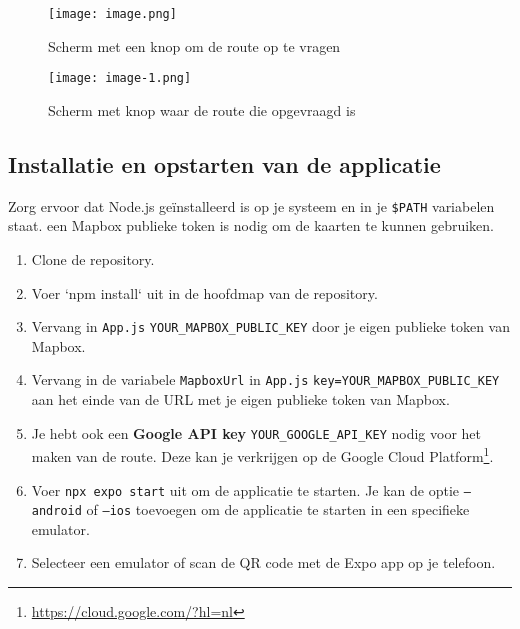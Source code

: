 \begin{figure}[htbp]
    \centering
    \begin{minipage}[b]{0.45\textwidth}
        \centering
        \texttt{[image: image.png]}
        \caption{Scherm met een knop om de route op te vragen}
        \label{fig:Scherm met een knop om de route op te vragen}
    \end{minipage}
    \hspace{0.05\textwidth}
    \begin{minipage}[b]{0.45\textwidth}
        \centering
        \texttt{[image: image-1.png]}
        \caption{Scherm met knop waar de route die opgevraagd is}
        \label{fig:Scherm met knop waar route die opgevraagd is}
    \end{minipage}
\end{figure}

\subsection{Installatie en opstarten van de applicatie}
\label{sec:installatie en opstarten van de applicatie}


Zorg ervoor dat Node.js geïnstalleerd is op je systeem en in je \texttt{\$PATH} variabelen staat.
een Mapbox publieke token is nodig om de kaarten te kunnen gebruiken.

\begin{enumerate}
    \item Clone de repository.
    \item Voer `npm install` uit in de hoofdmap van de repository.
    \item Vervang in \texttt{App.js} \texttt{YOUR\_MAPBOX\_PUBLIC\_KEY} door je eigen publieke token van Mapbox.
    \item Vervang in de variabele \texttt{MapboxUrl} in \texttt{App.js} \texttt{key=YOUR\_MAPBOX\_PUBLIC\_KEY} aan het einde van de URL met je eigen publieke token van Mapbox.
    \item Je hebt ook een \textbf{Google API key} \texttt{YOUR\_GOOGLE\_API\_KEY} nodig voor het maken van de route. Deze kan je verkrijgen op de Google Cloud Platform\footnote{\url{https://cloud.google.com/?hl=nl}}.
    \item Voer \texttt{npx expo start} uit om de applicatie te starten. Je kan de optie \texttt{--android} of \texttt{--ios} toevoegen om de applicatie te starten in een specifieke emulator.
    \item Selecteer een emulator of scan de QR code met de Expo app op je telefoon.
\end{enumerate}


